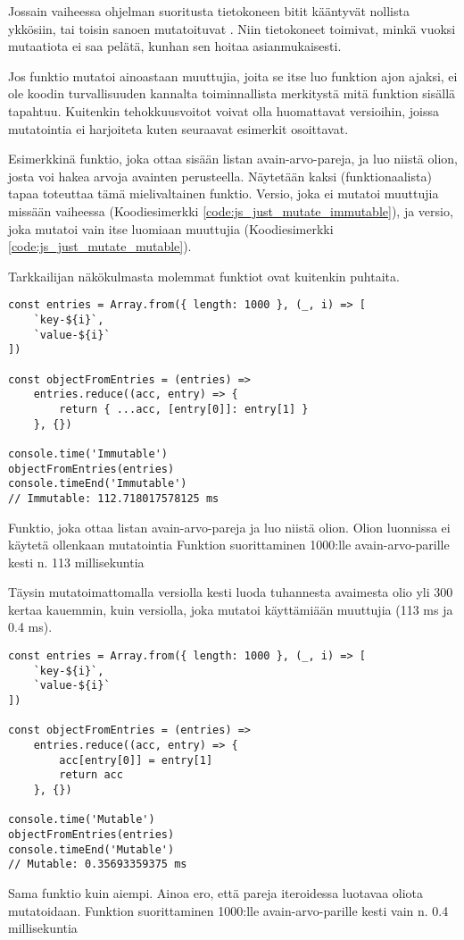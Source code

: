 Jossain vaiheessa ohjelman suoritusta tietokoneen bitit kääntyvät nollista ykkösiin, tai toisin sanoen mutatoituvat \cite{is_reduce_bad}. Niin tietokoneet toimivat, minkä vuoksi mutaatiota ei saa pelätä, kunhan sen hoitaa asianmukaisesti.

Jos funktio mutatoi ainoastaan muuttujia, joita se itse luo funktion ajon ajaksi, ei ole koodin turvallisuuden kannalta toiminnallista merkitystä mitä funktion sisällä tapahtuu. Kuitenkin tehokkuusvoitot voivat olla huomattavat versioihin, joissa mutatointia ei harjoiteta kuten seuraavat esimerkit osoittavat.

Esimerkkinä funktio, joka ottaa sisään listan avain-arvo-pareja, ja luo niistä olion, josta voi hakea arvoja avainten perusteella. Näytetään kaksi (funktionaalista) tapaa toteuttaa tämä mielivaltainen funktio.
Versio, joka ei mutatoi muuttujia missään vaiheessa (Koodiesimerkki \ref{code:js_just_mutate_immutable}), ja versio, joka mutatoi vain itse luomiaan muuttujia (Koodiesimerkki \ref{code:js_just_mutate_mutable}).

Tarkkailijan näkökulmasta molemmat funktiot ovat kuitenkin puhtaita.

\begin{code}
    \begin{verbatim}
const entries = Array.from({ length: 1000 }, (_, i) => [
    `key-${i}`,
    `value-${i}`
])

const objectFromEntries = (entries) =>
    entries.reduce((acc, entry) => {
        return { ...acc, [entry[0]]: entry[1] }
    }, {})

console.time('Immutable')
objectFromEntries(entries)
console.timeEnd('Immutable')
// Immutable: 112.718017578125 ms
\end{verbatim}
    \caption{Funktio, joka ottaa listan avain-arvo-pareja ja luo niistä olion. Olion luonnissa ei käytetä ollenkaan mutatointia Funktion suorittaminen 1000:lle avain-arvo-parille kesti n. 113 millisekuntia}
    \label{code:js_just_mutate_immutable}
\end{code}

Täysin mutatoimattomalla versiolla kesti luoda tuhannesta avaimesta olio yli 300 kertaa kauemmin, kuin versiolla, joka mutatoi käyttämiään muuttujia (113 ms ja 0.4 ms).


\begin{code}
    \begin{verbatim}
const entries = Array.from({ length: 1000 }, (_, i) => [
    `key-${i}`,
    `value-${i}`
])

const objectFromEntries = (entries) =>
    entries.reduce((acc, entry) => {
        acc[entry[0]] = entry[1]
        return acc
    }, {})
          
console.time('Mutable')
objectFromEntries(entries)
console.timeEnd('Mutable')
// Mutable: 0.35693359375 ms
\end{verbatim}
    \caption{Sama funktio kuin aiempi. Ainoa ero, että pareja iteroidessa luotavaa oliota mutatoidaan. Funktion suorittaminen 1000:lle avain-arvo-parille kesti vain n. 0.4 millisekuntia}
    \label{code:js_just_mutate_mutable}
\end{code}

